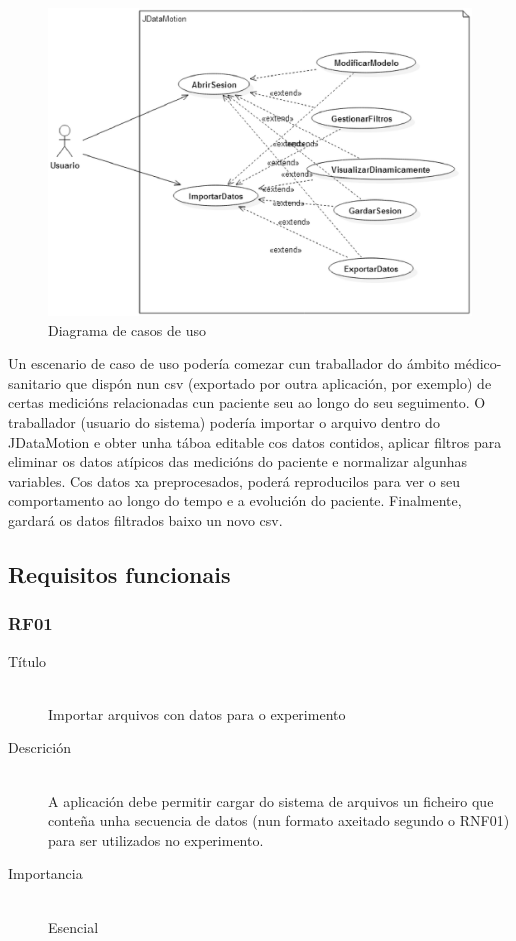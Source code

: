 \begin{figure}
\centering
\includegraphics[width=\textwidth,height=\textheight,keepaspectratio]{figuras/casosUso}
\caption{Diagrama de casos de uso}
\label{casosUso}
\end{figure}

Un escenario de caso de uso podería comezar cun traballador do ámbito médico-sanitario que dispón nun csv (exportado por outra aplicación, por exemplo) de certas medicións relacionadas cun paciente seu ao longo do seu seguimento. O traballador (usuario do sistema) podería importar o arquivo dentro do JDataMotion e obter unha táboa editable cos datos contidos, aplicar filtros para eliminar os datos atípicos das medicións do paciente e normalizar algunhas variables. Cos datos xa preprocesados, poderá reproducilos para ver o seu comportamento ao longo do tempo e a evolución do paciente. Finalmente, gardará os datos filtrados baixo un novo csv.

\subsection{Requisitos funcionais}

\subsubsection*{RF01}
\begin{description}
\item[Título] \hfill \\
Importar arquivos con datos para o experimento
\item[Descrición] \hfill \\
A aplicación debe permitir cargar do sistema de arquivos un ficheiro que conteña unha secuencia de datos (nun formato axeitado segundo o RNF01) para ser utilizados no experimento.
\item[Importancia] \hfill \\
Esencial
\end{description}

